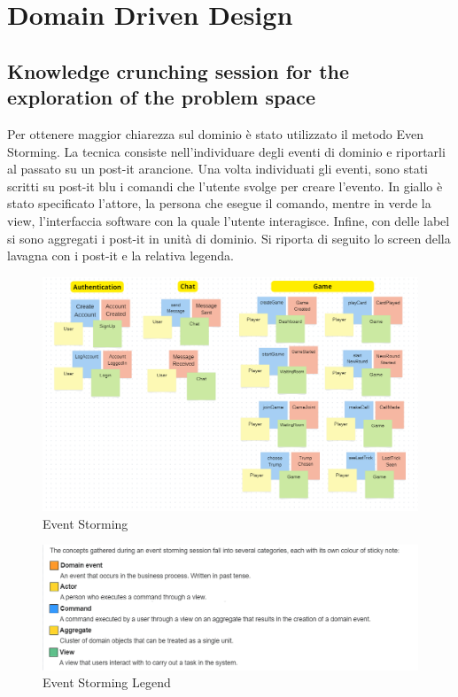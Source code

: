 \chapter{Domain Driven Design}
\label{ch:ddd} %

\section{Knowledge crunching session for the exploration of the problem space}
Per ottenere maggior chiarezza sul dominio è stato utilizzato il metodo Even Storming. 
La tecnica consiste nell'individuare degli eventi di dominio e riportarli al passato su un post-it arancione.
Una volta individuati gli eventi, sono stati scritti su post-it blu i comandi che l'utente svolge per creare l'evento.
In giallo è stato specificato l'attore, la persona che esegue il comando, mentre in verde la view, l'interfaccia software
 con la quale l'utente interagisce.
 Infine, con delle label si sono aggregati i post-it in unità di dominio.
 Si riporta di seguito lo screen della lavagna con i post-it e la relativa legenda.
 \begin{figure}[h!]
    \centering 
    \includegraphics[scale=0.45]{report/img/EventStorming.png}
    \caption{Event Storming}
    \label{event_storming}
\end{figure}

\begin{figure}[h!]
    \centering 
    \includegraphics[scale=0.60]{report/img/event_storming_legend.png}
    \caption{Event Storming Legend}
    \label{legend}
\end{figure}

